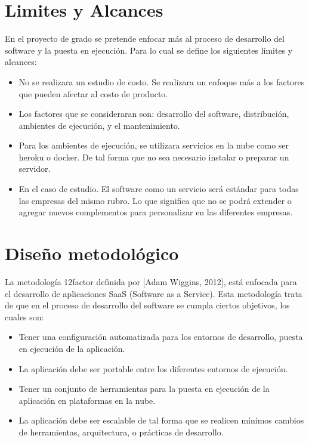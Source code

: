 \section{Limites y Alcances}
\noindent En el proyecto de grado se pretende enfocar más al proceso de desarrollo del software y la puesta en ejecución. Para lo cual se define los siguientes límites y alcances:
\begin{itemize}
  \item No se realizara un estudio de costo. Se realizara un enfoque más a los factores que pueden afectar al costo de producto.
  \item Los factores que se consideraran son: desarrollo del software, distribución, ambientes de ejecución, y el mantenimiento.
  \item Para los ambientes de ejecución, se utilizara servicios en la nube como ser heroku o docker. De tal forma que no sea necesario instalar o preparar un servidor.
  \item En el caso de estudio. El software como un servicio será estándar para todas las empresas del mismo rubro. Lo que significa que no se podrá extender o agregar nuevos complementos para personalizar en las diferentes empresas.
\end{itemize}

\section{Diseño metodológico}
\noindent La metodología 12factor definida por [Adam Wiggins, 2012], está enfocada para el desarrollo de aplicaciones SaaS (Software as a Service). Esta metodología trata de que en el proceso de desarrollo del software se cumpla ciertos objetivos, los cuales son:

\begin{itemize}
  \item Tener una configuración automatizada para los entornos de desarrollo, puesta en ejecución de la aplicación.
  \item La aplicación debe ser portable entre los diferentes entornos de ejecución.
  \item Tener un conjunto de herramientas para la puesta en ejecución de la aplicación en plataformas en la nube.
  \item La aplicación debe ser escalable de tal forma que se realicen mínimos cambios de herramientas, arquitectura, o prácticas de desarrollo.
\end{itemize}

